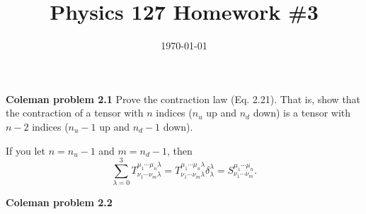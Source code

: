 \documentclass{article}
\date{\today}
\title{Physics 127 Homework \#3}
\begin{document}
\maketitle

\begin{prob}
\textbf{Coleman problem 2.1} Prove the contraction law (Eq. 2.21). That is, show that the contraction of a tensor with $n$ indices ($n_u$ up and $n_d$ down) is a tensor with $n - 2$ indices ($n_u - 1$ up and $n_d - 1$ down).
\end{prob}
If you let $n=n_u-1$ and $m=n_d-1$, then
\[ \sum_{\lambda=0}^3 T_{\nu_1 \cdots \nu_m \lambda}^{\mu_1 \cdots \mu_n \lambda} = T_{\nu_1 \cdots \nu_m \lambda}^{\mu_1 \cdots \mu_n \lambda} \delta_\lambda^\lambda = S_{\nu_1 \cdots \nu_m}^{\mu_1 \cdots \mu_n}. \]

\bigskip
\par
\begin{prob}
    \textbf{Coleman problem 2.2}
\end{prob}
\end{document}
